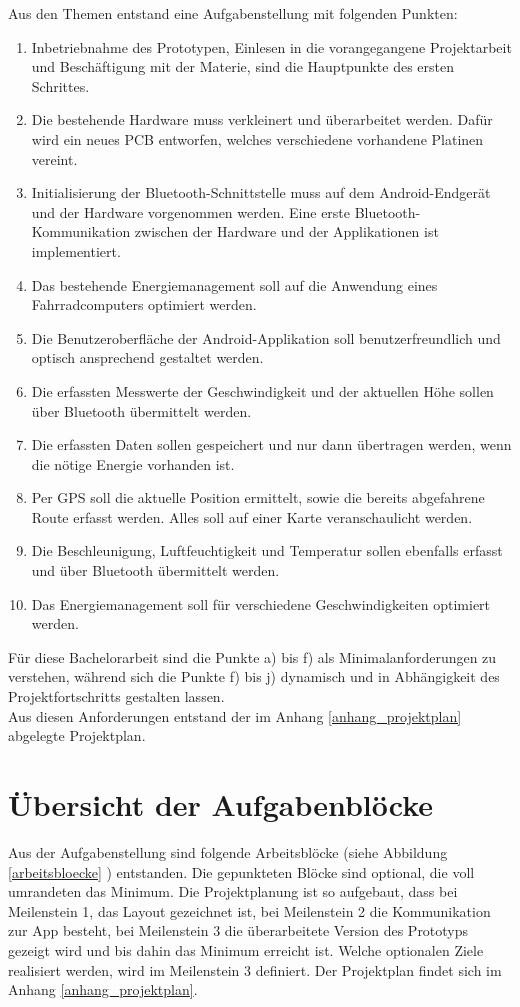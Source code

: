 Aus den Themen entstand eine Aufgabenstellung mit folgenden Punkten:


\begin{enumerate} 

\item Inbetriebnahme des Prototypen, Einlesen in die vorangegangene Projektarbeit und Beschäftigung mit der Materie, sind die Hauptpunkte des ersten Schrittes.
\item Die bestehende Hardware muss verkleinert und überarbeitet werden. Dafür wird ein neues PCB entworfen, welches verschiedene vorhandene Platinen vereint.
\item Initialisierung der Bluetooth-Schnittstelle muss auf dem Android-Endgerät und der Hardware vorgenommen werden. Eine erste Bluetooth-Kommunikation zwischen der Hardware und der Applikationen ist implementiert.
\item Das bestehende Energiemanagement soll auf die Anwendung eines Fahrradcomputers optimiert werden.
\item Die Benutzeroberfläche der Android-Applikation soll benutzerfreundlich und optisch ansprechend gestaltet werden.
\item Die erfassten Messwerte der Geschwindigkeit und der aktuellen Höhe sollen über Bluetooth übermittelt werden.
\item	Die erfassten Daten sollen gespeichert und nur dann übertragen werden, wenn die nötige Energie vorhanden ist.
\item	Per GPS soll die aktuelle Position ermittelt, sowie die bereits abgefahrene Route erfasst werden. Alles soll auf einer Karte veranschaulicht werden.
\item	Die Beschleunigung, Luftfeuchtigkeit und Temperatur sollen ebenfalls erfasst und über Bluetooth übermittelt werden.
\item	Das Energiemanagement soll für verschiedene Geschwindigkeiten optimiert werden.
\end{enumerate}

Für diese Bachelorarbeit sind die Punkte a) bis f) als Minimalanforderungen zu verstehen, während sich die Punkte f) bis j) dynamisch und in Abhängigkeit des Projektfortschritts gestalten lassen.\\

Aus diesen Anforderungen entstand der im Anhang \ref{anhang_projektplan} abgelegte Projektplan.

\section{Übersicht der Aufgabenblöcke}
Aus der Aufgabenstellung sind folgende Arbeitsblöcke (siehe Abbildung \ref{arbeitsbloecke} ) entstanden. Die gepunkteten Blöcke sind optional, die voll umrandeten das Minimum. Die Projektplanung ist so aufgebaut, dass bei Meilenstein 1, das Layout gezeichnet ist, bei Meilenstein 2 die Kommunikation zur App besteht, bei Meilenstein 3 die überarbeitete Version des Prototyps gezeigt wird und bis dahin das Minimum erreicht ist. Welche optionalen Ziele realisiert werden, wird im Meilenstein 3 definiert. Der Projektplan findet sich im Anhang \ref{anhang_projektplan}.

